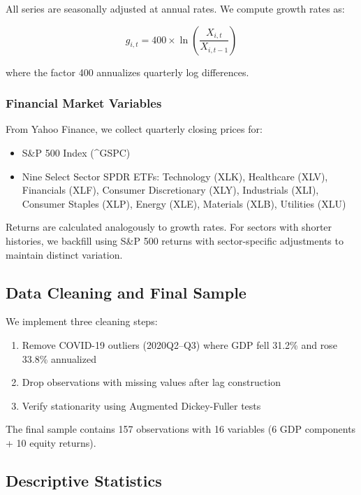 \documentclass[11pt,letterpaper]{article}
\theoremstyle{plain}
\theoremstyle{definition}
\theoremstyle{remark}
\begin{document}
All series are seasonally adjusted at annual rates. We compute growth rates as:

\begin{equation}
g_{i,t} = 400 \times \ln\left(\frac{X_{i,t}}{X_{i,t-1}}\right)
\end{equation}

where the factor 400 annualizes quarterly log differences.

\subsubsection{Financial Market Variables}

From Yahoo Finance, we collect quarterly closing prices for:

\begin{itemize}
\item S\&P 500 Index (\^{}GSPC)
\item Nine Select Sector SPDR ETFs: Technology (XLK), Healthcare (XLV), Financials (XLF), Consumer Discretionary (XLY), Industrials (XLI), Consumer Staples (XLP), Energy (XLE), Materials (XLB), Utilities (XLU)
\end{itemize}

Returns are calculated analogously to growth rates. For sectors with shorter histories, we backfill using S\&P 500 returns with sector-specific adjustments to maintain distinct variation.

\subsection{Data Cleaning and Final Sample}

We implement three cleaning steps:

\begin{enumerate}
\item Remove COVID-19 outliers (2020Q2--Q3) where GDP fell 31.2\% and rose 33.8\% annualized
\item Drop observations with missing values after lag construction
\item Verify stationarity using Augmented Dickey-Fuller tests
\end{enumerate}

The final sample contains 157 observations with 16 variables (6 GDP components + 10 equity returns).

\subsection{Descriptive Statistics}
\end{document}
